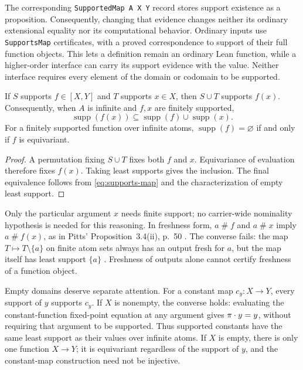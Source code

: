 The corresponding \texttt{SupportedMap A X Y} record stores support existence
as a proposition. Consequently, changing that evidence changes neither its
ordinary extensional equality nor its computational behavior. Ordinary inputs
use \texttt{SupportsMap} certificates, with a proved correspondence to support
of their full function objects. This lets a definition remain an ordinary Lean
function, while a higher-order interface can carry its support evidence with
the value. Neither interface requires every element of the domain or codomain
to be supported.

\begin{proposition}
\label{prop:function-evaluation-support}
If $S$ supports $f\in[X,Y]$ and $T$ supports $x\in X$, then $S\cup T$
supports $f(x)$. Consequently, when $A$ is infinite and $f,x$ are
finitely supported,
\begin{equation}
  \operatorname{supp}(f(x))
    \subseteq \operatorname{supp}(f)\cup\operatorname{supp}(x).
  \label{eq:function-evaluation-bound}
\end{equation}
For a finitely supported function over infinite atoms,
$\operatorname{supp}(f)=\varnothing$ if and only if $f$ is equivariant.
\end{proposition}

\begin{proof}
A permutation fixing $S\cup T$ fixes both $f$ and $x$. Equivariance of
evaluation therefore fixes $f(x)$. Taking least supports gives the
inclusion. The final equivalence follows from
\eqref{eq:supports-map} and the characterization of empty least support.
\end{proof}

Only the particular argument $x$ needs finite support; no carrier-wide
nominality hypothesis is needed for this reasoning. In freshness form,
$a\mathbin{\#}f$ and $a\mathbin{\#}x$ imply
$a\mathbin{\#}f(x)$, as in Pitts' Proposition~3.4(ii), p.~50
\cite{pitts2013}. The converse fails: the map $T\mapsto T\setminus\{a\}$
on finite atom sets always has an output fresh for $a$, but the map itself
has least support $\{a\}$ \cite[Example~3.5, pp.~50--51]{pitts2013}.
Freshness of outputs alone cannot certify freshness of a function object.

Empty domains deserve separate attention. For a constant map $c_y:X\to Y$,
every support of $y$ supports $c_y$. If $X$ is nonempty, the converse
holds: evaluating the constant-function fixed-point equation at any
argument gives $\pi\mathbin{\cdot} y=y$, without requiring that argument to be
supported. Thus supported constants have the same least support as their
values over infinite atoms. If $X$ is empty, there is only one function
$X\to Y$; it is equivariant regardless of the support of $y$, and the
constant-map construction need not be injective.

